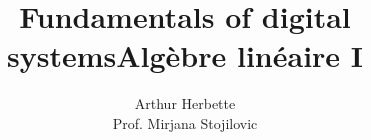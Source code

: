 \documentclass[11pt]{book}
\title{Fundamentals of digital systems}
\author{Arthur Herbette \\
Prof. Mirjana Stojilovic}
\begin{document}
\setcounter{section}{8}
\title{Algèbre linéaire I}
\maketitle
\thispagestyle{empty}
\tableofcontents
\thispagestyle{empty}
\listoflectures

\end{document}
